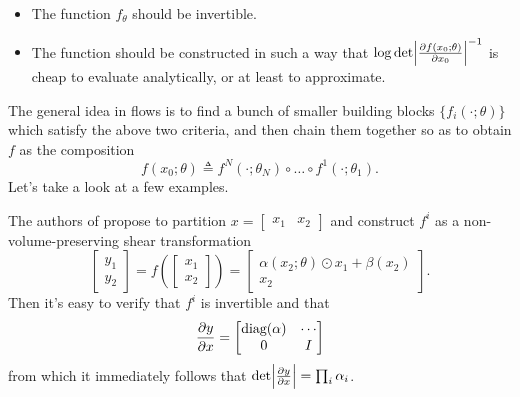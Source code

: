 \documentclass{scrartcl}
\begin{document}
\begin{itemize}
    \item The function $f_\theta$ should be invertible.
    \item The function should be constructed in such a way that $ \log \det\abs*{\pdv{f(x_0;\theta)}{x_0}}^{-1}$ is cheap to evaluate analytically, or at least to approximate.
\end{itemize}
The general idea in flows is to find a bunch of smaller building blocks $\{f_i(\cdot; \theta)\}$ which satisfy the above two criteria, and then chain them together so as to obtain $f$ as the composition
\begin{equation}
f(x_0; \theta) \triangleq f^N(\cdot; \theta_N) \circ \dots \circ f^1(\cdot; \theta_1).
\end{equation}
Let's take a look at a few examples.
\begin{examplebox}[RealNVP]
The authors of \citep{realnvp} propose to partition $x = \begin{bmatrix}x_1 & x_2\end{bmatrix}$ and construct $f^i$ as a non-volume-preserving shear transformation
\begin{equation}
    \begin{bmatrix} y_1 \\ y_2 \end{bmatrix} = f\left(\begin{bmatrix} x_1 \\ x_2 \end{bmatrix}\right) = \begin{bmatrix} \alpha(x_2; \theta) \odot x_1 + \beta(x_2) \\ x_2 \end{bmatrix}.
\end{equation}
Then it's easy to verify that $f^i$ is invertible and that 
\begin{equation}
\pdv{y}{x} = \begin{bmatrix} \text{diag}(\alpha) & \cdots \\ 0 & I \end{bmatrix}
\end{equation}
from which it immediately follows that $\det\abs*{\pdv{y}{x}} = \prod_i \alpha_i$.
\end{examplebox}
\end{document}
